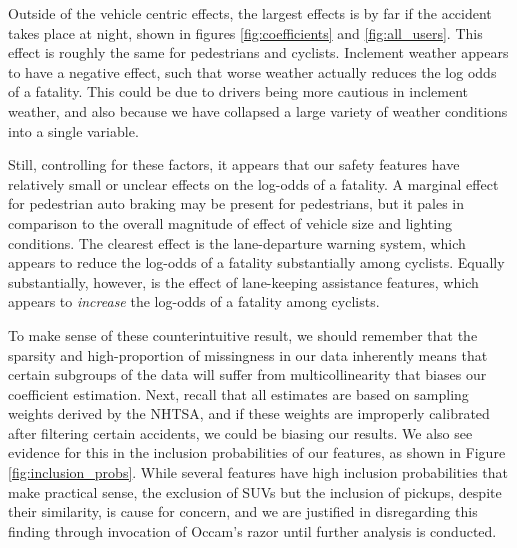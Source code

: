 \documentclass[12pt]{article}
\begin{document}
Outside of the vehicle centric effects, the largest effects is by far if the accident takes place at night, shown in
figures \ref{fig:coefficients} and \ref{fig:all_users}. This effect is roughly the same for pedestrians and cyclists.
Inclement weather appears to have a negative effect, such that
worse weather actually reduces the log odds of a fatality. This could be due to drivers being more cautious in
inclement weather, and also because we have collapsed a large variety of weather conditions into a single variable.

Still, controlling for these factors, it appears that our safety features have relatively small or unclear effects on
the log-odds of a fatality. A marginal effect for pedestrian auto braking may be present for pedestrians, but it pales
in comparison to the overall magnitude of effect of vehicle size and lighting conditions.
The clearest effect is the lane-departure warning system, which appears to reduce the
log-odds of a fatality substantially among cyclists. Equally substantially, however, is the effect of lane-keeping
assistance features, which appears to \textit{increase} the log-odds of a fatality among cyclists.

To make sense of these counterintuitive result, we should remember that the sparsity and high-proportion of missingness
in our data inherently means that certain subgroups of the data will suffer from multicollinearity that biases
our coefficient estimation. Next, recall that all estimates are based on sampling weights derived by the NHTSA, and if
these weights are improperly calibrated after filtering certain accidents, we could be biasing our results.
We also see evidence for this in the inclusion probabilities of our features, as shown in 
Figure \ref{fig:inclusion_probs}. While several features have high inclusion probabilities that make practical sense, 
the exclusion of SUVs but the inclusion of pickups, despite their similarity, is cause for concern, and we are 
justified in disregarding this finding through invocation of Occam's razor until further analysis is conducted.
\end{document}
